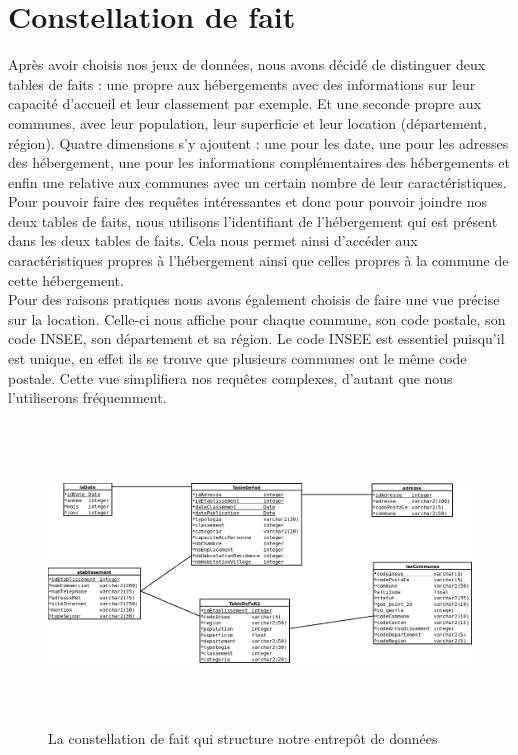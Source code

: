 \documentclass[a4paper,sffamily,12pt]{article}
\begin{document}
		\vspace{0.5cm}
		
	\section{Constellation de fait}

		\vspace{0.5cm}
			
		Après avoir choisis nos jeux de données, nous avons décidé de distinguer deux tables de faits : une propre aux hébergements avec des informations sur leur capacité d'accueil et leur classement par exemple. Et une seconde propre aux communes, avec leur population, leur superficie et leur location (département, région). Quatre dimensions s'y ajoutent : une pour les date, une pour les adresses des hébergement, une pour les informations complémentaires des hébergements et enfin une relative aux communes avec un certain nombre de leur caractéristiques. Pour pouvoir faire des requêtes intéressantes et donc pour pouvoir joindre nos deux tables de faits, nous utilisons l'identifiant de l'hébergement qui est présent dans les deux tables de faits. Cela nous permet ainsi d'accéder aux caractéristiques propres à l'hébergement ainsi que celles propres à la commune de cette hébergement. \\
		
		Pour des raisons pratiques nous avons également choisis de faire une vue précise sur la location. Celle-ci nous affiche pour chaque commune, son code postale, son code INSEE, son département et sa région. Le code INSEE est essentiel puisqu'il est unique, en effet ils se trouve que plusieurs communes ont le même code postale. Cette vue simplifiera nos requêtes complexes, d'autant que nous l'utiliserons fréquemment. \\
	
		\vspace{0.5cm}
		
		\begin{figure}[!h]
				
			\centerline{\includegraphics[height=8cm]{picture/constellation_de_fait.png}}
			\caption{La constellation de fait qui structure notre entrepôt de données}
			\label{constellation}
			
		\end{figure}	
		
\end{document}
